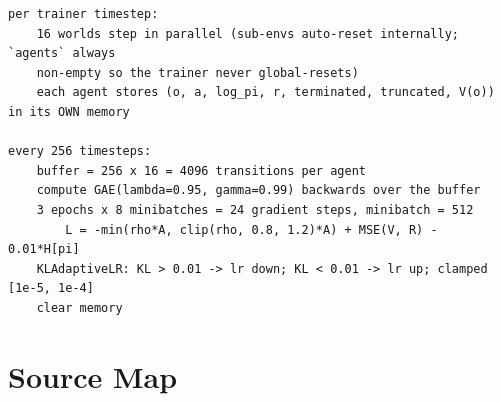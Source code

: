 \documentclass[11pt,a4paper]{article}
\begin{document}
\begin{lstlisting}
per trainer timestep:
    16 worlds step in parallel (sub-envs auto-reset internally; `agents` always
    non-empty so the trainer never global-resets)
    each agent stores (o, a, log_pi, r, terminated, truncated, V(o)) in its OWN memory

every 256 timesteps:
    buffer = 256 x 16 = 4096 transitions per agent
    compute GAE(lambda=0.95, gamma=0.99) backwards over the buffer
    3 epochs x 8 minibatches = 24 gradient steps, minibatch = 512
        L = -min(rho*A, clip(rho, 0.8, 1.2)*A) + MSE(V, R) - 0.01*H[pi]
    KLAdaptiveLR: KL > 0.01 -> lr down; KL < 0.01 -> lr up; clamped [1e-5, 1e-4]
    clear memory
\end{lstlisting}

\section{Source Map}
\label{app:src}
\end{document}
